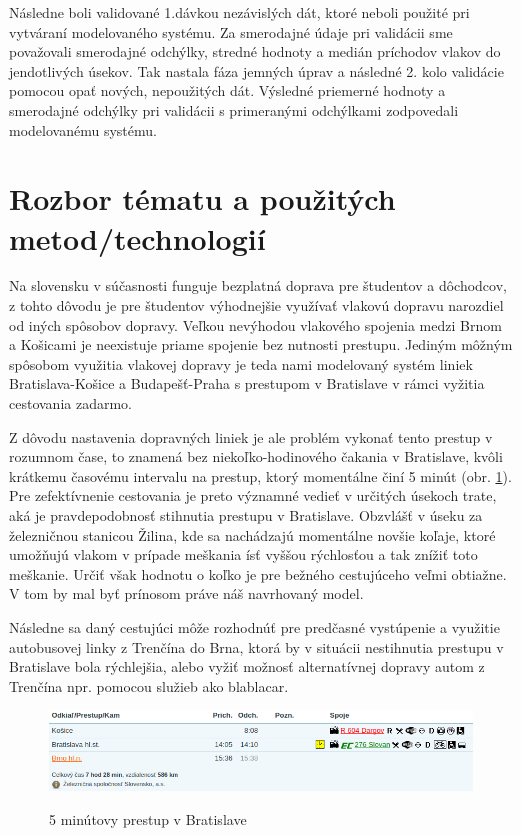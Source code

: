 \documentclass[11pt,a4paper]{article}
\begin{document}
Následne boli validované 1.dávkou nezávislých dát, ktoré neboli použité pri vytváraní modelovaného systému.
Za smerodajné údaje pri validácii sme považovali smerodajné odchýlky, stredné hodnoty a medián príchodov vlakov do jendotlivých úsekov.
Tak nastala fáza jemných úprav a následné 2. kolo validácie pomocou opať nových, nepoužitých dát.
Výsledné priemerné hodnoty a smerodajné odchýlky pri validácii s primeranými odchýlkami zodpovedali modelovanému systému.

\section{Rozbor tématu a použitých metod/technologií}
\label{sec:ROZBOR}

Na slovensku v súčasnosti funguje bezplatná doprava pre študentov a dôchodcov, z tohto dôvodu je pre študentov výhodnejšie využívať vlakovú dopravu narozdiel od iných spôsobov dopravy.
Veľkou nevýhodou vlakového spojenia medzi Brnom a Košicami je neexistuje priame spojenie bez nutnosti prestupu.
Jediným môžným spôsobom využitia vlakovej dopravy je teda nami modelovaný systém liniek Bratislava-Košice a Budapešť-Praha s prestupom v Bratislave v rámci vyžitia cestovania zadarmo.

Z dôvodu nastavenia dopravných liniek je ale problém vykonať tento prestup v rozumnom čase, to znamená bez niekoľko-hodinového čakania v Bratislave, kvôli krátkemu časovému intervalu na prestup, ktorý momentálne činí 5 minút (obr. \ref{pic:IMSPRESTUP}).
Pre zefektívnenie cestovania je preto významné vedieť v určitých úsekoch trate, aká je pravdepodobnosť stihnutia prestupu v Bratislave.
Obzvlášť v úseku za železničnou stanicou Žilina, kde sa nachádzajú momentálne novšie koľaje, ktoré umožňujú vlakom v prípade meškania ísť vyššou rýchlosťou a tak znížiť toto meškanie.
Určiť však hodnotu o koľko je pre bežného cestujúceho veľmi obtiažne.
V tom by mal byť prínosom práve náš navrhovaný model.

Následne sa daný cestujúci môže rozhodnúť pre predčasné vystúpenie a využitie autobusovej linky z Trenčína do Brna, ktorá by v situácii nestihnutia prestupu v Bratislave bola rýchlejšia, alebo vyžiť možnosť alternatívnej dopravy autom z Trenčína npr. pomocou služieb ako blablacar\cite{odkaz:blablacar}.

\begin{figure}[H]
    \begin{center}
    \scalebox{0.6}
    {
        \includegraphics{imsprestup.png}
    }
    \caption{5 minútovy prestup v Bratislave}
    \label{pic:IMSPRESTUP}
    \end{center}
\end{figure}
\end{document}
